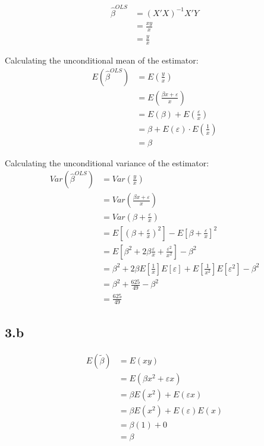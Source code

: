 \documentclass{article}
\begin{document}
\begin{align*}
    \hat{\beta}^{OLS}
    &= (X'X)^{-1}X'Y\\
    &= \frac{xy}{x}\\
    &= \frac{y}{x}
\end{align*}

Calculating the unconditional mean of the estimator:
\begin{align*}
    E(\hat{\beta}^{OLS})
    &= E\left(\frac{y}{x}\right)\\
    &= E\left(\frac{\beta x + \varepsilon}{x}\right)\\
    &= E(\beta) + E\left(\frac{\varepsilon}{x}\right)\\
    &= \beta + E(\varepsilon) \cdot E\left(\frac{1}{x}\right)\\
    &= \beta
\end{align*}

Calculating the unconditional variance of the estimator:
\begin{align*}
    Var(\hat{\beta}^{OLS})
    &= Var\left(\frac{y}{x}\right)\\
    &= Var\left(\frac{\beta x + \varepsilon}{x}\right)\\
    &= Var\left(\beta + \frac{\varepsilon}{x}\right)\\
    &= E\left[\left(\beta + \frac{\varepsilon}{x}\right)^2\right] 
    - E\left[\beta + \frac{\varepsilon}{x}\right]^2\\
    &= E\left[\beta^2 + 2\beta \frac{\varepsilon}{x} + \frac{\varepsilon^2}{x^2} \right]
    - \beta^2\\
    &= \beta^2 + 2\beta E\left[\frac{1}{x}\right] E[\varepsilon] + E\left[\frac{1}{x^2}\right] E[\varepsilon^2] - \beta^2\\
    &= \beta^2 + \frac{625}{49} - \beta^2\\
    &= \frac{625}{49}
\end{align*}

\subsection*{3.b}

\begin{align*}
    E(\tilde{\beta})
    &= E\left(xy\right)\\
    &= E(\beta x^2 + \varepsilon x)\\
    &= \beta E(x^2) + E(\varepsilon x)\\
    &= \beta E(x^2) + E(\varepsilon)E(x)\\
    &= \beta(1) + 0\\
    &= \beta
\end{align*}
\end{document}
